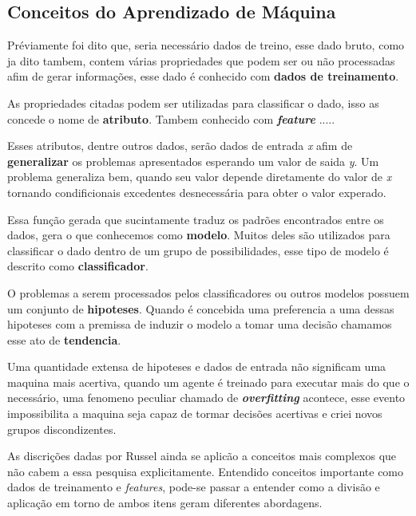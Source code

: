 \subsection{Conceitos do Aprendizado de Máquina}
Préviamente foi dito que, seria necessário dados de treino, esse dado bruto, como ja dito tambem, contem várias propriedades que podem ser ou não processadas afim de gerar informações, esse dado é conhecido com \textbf{dados de treinamento}.

As propriedades citadas podem ser utilizadas para classificar o dado, isso as concede o nome de \textbf{atributo}. Tambem conhecido com \textbf{\textit{feature}} .....

Esses atributos, dentre outros dados, serão dados de entrada \textit{x} afim de \textbf{generalizar} os problemas apresentados esperando um valor de saida \textit{y}. Um problema generaliza bem, quando seu valor depende diretamente do valor de \textit{x} tornando condificionais excedentes desnecessária para obter o valor experado.

Essa função gerada que sucintamente traduz os padrões encontrados entre os dados, gera o que conhecemos como \textbf{modelo}. Muitos deles são utilizados para classificar o dado dentro de um grupo de possibilidades, esse tipo de modelo é descrito como \textbf{classificador}.

O problemas a serem processados pelos classificadores ou outros modelos possuem um conjunto de \textbf{hipoteses}. Quando é concebida uma preferencia a uma dessas hipoteses com a premissa de induzir o modelo a tomar uma decisão chamamos esse ato de \textbf{tendencia}.

Uma quantidade extensa de hipoteses e dados de entrada não significam uma maquina mais acertiva, quando um agente é treinado para executar mais do que o necessário, uma fenomeno peculiar chamado de \textbf{\textit{overfitting}} acontece, esse evento impossibilita a maquina seja capaz de tormar decisões acertivas e criei novos grupos discondizentes.

As discrições dadas por Russel \cite[693]{russell2003artificial} ainda se aplicão a conceitos mais complexos que não cabem a essa pesquisa explicitamente. Entendido conceitos importante como dados de treinamento e \textit{features}, pode-se passar a entender como a divisão e aplicação em torno de ambos itens geram diferentes abordagens.